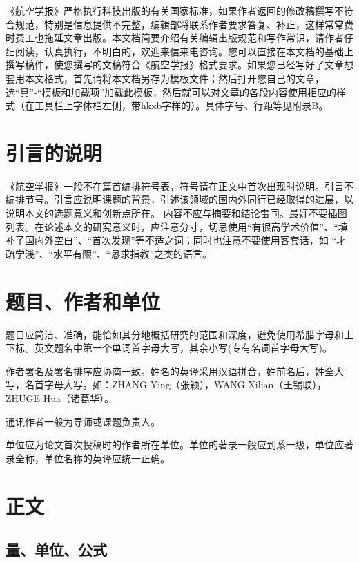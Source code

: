 \documentclass[10.5pt,twocolumn]{aaas}
\begin{document}
《航空学报》\enlargethispage{-3.0cm}严格执行科技出版的有关国家标准，如果作者返回的修改稿撰写不符合规范，特别是信息提供不完整，编辑部将联系作者要求答复、补正，这样常常费时费工也拖延文章出版。本文档简要介绍有关编辑出版规范和写作常识，请作者仔细阅读，认真执行，不明白的，欢迎来信来电咨询。您可以直接在本文档的基础上撰写稿件，使您撰写的文稿符合《航空学报》格式要求。如果您已经写好了文章想套用本文格式，首先请将本文档另存为模板文件；然后打开您自己的文章，选“具”-“模板和加载项”加载此模板，然后就可以对文章的各段内容使用相应的样式（在工具栏上字体栏左侧，带hkxb字样的）。具体字号、行距等见附录B。\enlargethispage{-3.0cm}

\section{引言的说明}
《航空学报》一般不在篇首编排符号表，符号请在正文中首次出现时说明。引言不编排节号。引言应说明课题的背景，引述该领域的国内外同行已经取得的进展，以说明本文的选题意义和创新点所在。 内容不应与摘要和结论雷同。最好不要插图列表。在论述本文的研究意义时，应注意分寸，切忌使用“有很高学术价值”、“填补了国内外空白”、“首次发现”等不适之词；同时也注意不要使用客套话，如 “才疏学浅”、“水平有限”、“恳求指教”之类的语言。

\section{题目、作者和单位}

题目应简洁、准确，能恰如其分地概括研究的范围和深度，避免使用希腊字母和上下标。英文题名中第一个单词首字母大写，其余小写(专有名词首字母大写)。

作者署名及署名排序应协商一致。姓名的英译采用汉语拼音，姓前名后，姓全大写，名首字母大写。如：ZHANG Ying（张颖），WANG Xilian（王锡联），ZHUGE Hua（诸葛华）。

通讯作者一般为导师或课题负责人。

单位应为论文首次投稿时的作者所在单位。单位的著录一般应到系一级，单位应著录全称，单位名称的英译应统一正确。

\section{正文}
\subsection{量、单位、公式}
\end{document}
